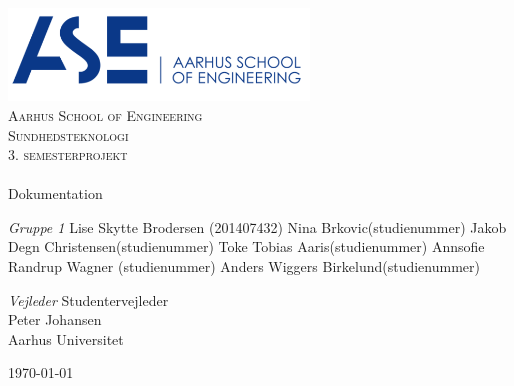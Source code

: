 \begin{titlingpage}
\begin{center}

~ \\[3cm]


\includegraphics[width=0.6\textwidth]{Figurer/ASE}\\[1cm]

\textsc{\LARGE Aarhus School of Engineering}\\[1.5cm]

\textsc{\Large Sundhedsteknologi}\\
\textsc{\Large 3. semesterprojekt}\\[0.5cm]

\noindent\makebox[\linewidth]{\rule{\textwidth}{0.4pt}}\\
[0.5cm]{\Huge Dokumentation}
\noindent\makebox[\linewidth]{\rule{\textwidth}{0.4pt}}

\end{center}

\textit{Gruppe 1} \newline
Lise Skytte Brodersen (201407432) \newline
Nina Brkovic(studienummer) \newline
Jakob Degn Christensen(studienummer) \newline
Toke Tobias Aaris(studienummer) \newline		 
Annsofie Randrup Wagner (studienummer) \newline 
Anders Wiggers Birkelund(studienummer) \newline



\textit{Vejleder} \newline
Studentervejleder\\
Peter Johansen\\
Aarhus Universitet


\vfill

\begin{center}
{\large \today}
\end{center}


\end{titlingpage}